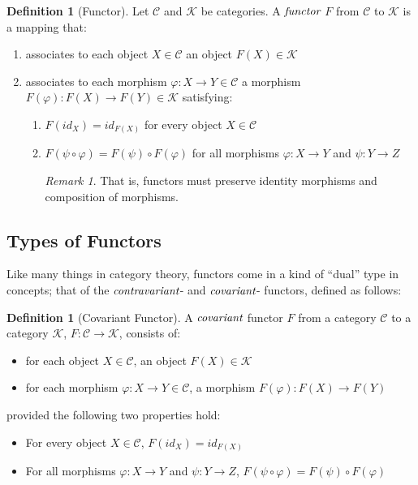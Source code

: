 \documentclass[10pt, oneside, reqno]{amsart}
\theoremstyle{plain}%
\theoremstyle{definition}
\newtheorem{defn}[thm]{Definition}
\theoremstyle{remark}
\newtheorem*{rem}{Remark}
\newcommand{\Id}{\mathit{id}_}
\begin{document}
\begin{defn}[Functor]
	Let $\mathcal{C}$ and $\mathcal{K}$ be categories. A $\emph{functor}$ $F$ from $\mathcal{C}$ to $\mathcal{K}$ is a mapping that:
	\begin{enumerate}
		\item associates to each object $X \in \mathcal{C}$ an object $F(X) \in  \mathcal{K}$
		
		\item associates to each morphism $\varphi: X \to Y \in \mathcal{C}$ a morphism $F(\varphi) : F(X) \to F(Y) \in \mathcal{K}$
		satisfying:
		\begin{enumerate}
			\item $F(id_{X}) = id_{F(X)}$ for every object $X \in \mathcal{C}$
			
			\item $F(\psi \circ \varphi) = F(\psi) \circ F(\varphi)$ for all morphisms $\varphi: X \to Y$ and $\psi: Y \to Z$
			\begin{rem}
				That is, functors must preserve identity morphisms and composition of morphisms.
			\end{rem}
		\end{enumerate}
	\end{enumerate}
\end{defn}

\subsection{Types of Functors} %
\label{subsec:functorstypes}
Like many things in category theory, functors come in a kind of ``dual'' type in concepts;
that of the $\emph{contravariant}$- and $\emph{covariant}$- functors, defined as follows:

\begin{defn}[Covariant Functor]
 A $\emph{covariant}$ functor $F$ from a category $\mathcal{C}$ to a category $\mathcal{K}$, $F: \mathcal{C} \to \mathcal{K}$, consists of:
 \begin{itemize}
  \item for each object $X \in \mathcal{C}$, an object $F(X) \in \mathcal{K}$
  \item for each morphism $\varphi: X \to Y \in \mathcal{C}$, a morphism $F(\varphi): F(X) \to F(Y)$
 \end{itemize}
 provided the following two properties hold:
 \begin{itemize}
  \item For every object $X \in \mathcal{C}$, $F(\Id{X}) = \Id{F(X)}$
  \item For all morphisms $\varphi: X \to Y$ and $\psi: Y \to Z$, $F(\psi \circ \varphi) = F(\psi) \circ F(\varphi)$
 \end{itemize}
\end{defn}
\end{document}
